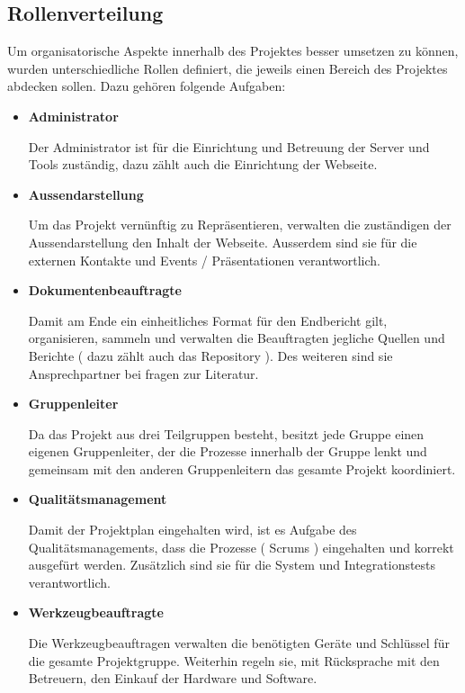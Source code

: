 \subsection{Rollenverteilung}

Um organisatorische Aspekte innerhalb des Projektes besser umsetzen zu k\"onnen, wurden unterschiedliche Rollen definiert, die jeweils einen Bereich des Projektes abdecken sollen. Dazu geh\"oren folgende Aufgaben:

\begin{itemize}
\item\textbf{Administrator}

Der Administrator ist f\"ur die Einrichtung und Betreuung der Server und Tools zust\"andig, dazu z\"ahlt auch die Einrichtung der Webseite.

\item \textbf{Aussendarstellung}

Um das Projekt vern\"unftig zu Repr\"asentieren, verwalten die zust\"andigen der Aussendarstellung den Inhalt der Webseite. Ausserdem sind sie f\"ur die externen Kontakte und Events / Pr\"asentationen verantwortlich.

\item \textbf{Dokumentenbeauftragte}

Damit am Ende ein einheitliches Format f\"ur den Endbericht gilt, organisieren, sammeln und verwalten die Beauftragten jegliche Quellen und Berichte ( dazu z\"ahlt auch das Repository ). Des weiteren sind sie Ansprechpartner bei fragen zur Literatur.

\item \textbf{Gruppenleiter}

Da das Projekt aus drei Teilgruppen besteht, besitzt jede Gruppe einen eigenen Gruppenleiter, der die Prozesse innerhalb der Gruppe lenkt und gemeinsam mit den anderen Gruppenleitern das gesamte Projekt koordiniert.

\item \textbf{Qualit\"atsmanagement}

Damit der Projektplan eingehalten wird, ist es Aufgabe des Qualit\"atsmanagements, dass die Prozesse ( Scrums ) eingehalten und korrekt ausgef\"urt werden. Zus\"atzlich sind sie f\"ur die System und Integrationstests verantwortlich.

\item \textbf{Werkzeugbeauftragte}

Die Werkzeugbeauftragen verwalten die ben\"otigten Ger\"ate und Schl\"ussel f\"ur die gesamte Projektgruppe. Weiterhin regeln sie, mit R\"ucksprache mit den Betreuern, den Einkauf der Hardware und Software.

\end{itemize}


